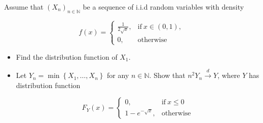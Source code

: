Assume that \(\left( \mathit{X}_{\mathit{n}} \right)_{\mathit{n} \in \mathbb{N}}\) be a sequence of i.i.d random variables with density

\[\mathit{f}(\mathit{x}) = \left\{ \begin{matrix}
{\frac{1}{2\sqrt{\mathit{x}}},} & {\text{if}\ \mathit{x} \in (0,1),} \\
{0,} & \text{otherwise}
\end{matrix} \right.\]

\begin{itemize}
\item
  Find the distribution function of \(\mathit{X}_{1}\).
\item
  Let \(\mathit{Y}_{\mathit{n}} = \min\left\{ {\mathit{X}_{1},\ldots,\mathit{X}_{\mathit{n}}} \right\}\) for any \(\mathit{n} \in \mathbb{N}\). Show that \(\mathit{n}^{2}\mathit{Y}_{\mathit{n}}\overset{\mathit{d}}{\rightarrow}\mathit{Y}\), where \(\mathit{Y}\) has distribution function

  \[\mathit{F}_{\mathit{Y}}(\mathit{x}) = \left\{ \begin{matrix}
  {0,} & {\text{if}\ \mathit{x} \leq 0} \\
  {1 - \mathit{e}^{- \sqrt{\mathit{x}}},} & \text{otherwise}
  \end{matrix} \right.\]
\end{itemize}


